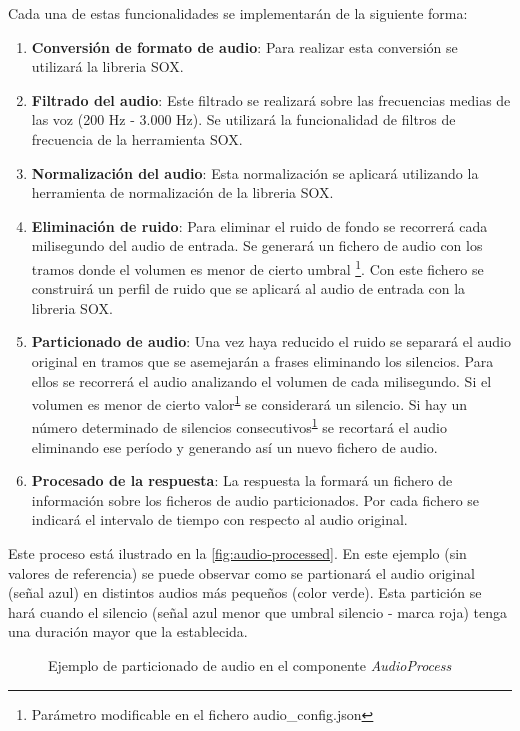\documentclass[../main.tex]{subfiles}
\begin{document}
Cada una de estas funcionalidades se implementarán de la siguiente forma:
\begin{enumerate}
    \item \textbf{Conversión de formato de audio}: Para realizar esta conversión se utilizará la libreria SOX.
    \item \textbf{Filtrado del audio}: Este filtrado se realizará sobre las frecuencias medias de las voz (200 Hz - 3.000 Hz). Se utilizará la funcionalidad de filtros de frecuencia de la herramienta SOX.
    \item \textbf{Normalización del audio}: Esta normalización se aplicará utilizando la herramienta de normalización de la libreria SOX.
    \item \textbf{Eliminación de ruido}: Para eliminar el ruido de fondo se recorrerá cada milisegundo del audio de entrada. Se generará un fichero de audio con los tramos donde el volumen es menor de cierto umbral \footnote{Parámetro modificable en el fichero audio\_config.json\label{footnote:audio_modificable}}. Con este fichero se construirá un perfil de ruido que se aplicará al audio de entrada con la libreria SOX.
    \item \textbf{Particionado de audio}: Una vez haya reducido el ruido se separará el audio original en tramos que se asemejarán a frases eliminando los silencios. Para ellos se recorrerá el audio analizando el volumen de cada milisegundo. Si el volumen es menor de cierto valor\textsuperscript{\ref{footnote:audio_modificable}} se considerará un silencio. Si hay un número determinado de silencios consecutivos\textsuperscript{\ref{footnote:audio_modificable}} se recortará el audio eliminando ese período y generando así un nuevo fichero de audio.
    \item \textbf{Procesado de la respuesta}: La respuesta la formará un fichero de información sobre los ficheros de audio particionados. Por cada fichero se indicará el intervalo de tiempo con respecto al audio original.
\end{enumerate}

Este proceso está ilustrado en la \autoref{fig:audio-processed}. En este ejemplo (sin valores de referencia) se puede observar como se partionará el audio original (señal azul) en distintos audios más pequeños (color verde). Esta partición se hará cuando el silencio (señal azul menor que umbral silencio - marca roja) tenga una duración mayor que la establecida.

\begin{figure}[H]
    \centering
    
    \caption{Ejemplo de particionado de audio en el componente \textit{AudioProcess}}
    \label{fig:audio-processed}
\end{figure}
\end{document}
